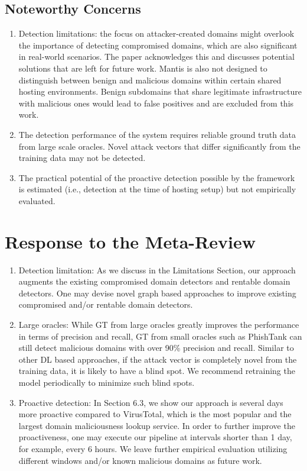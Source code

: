 \subsection{Noteworthy Concerns}
\begin{enumerate}
\item Detection limitations: the focus on attacker-created domains might overlook the importance of detecting compromised domains, which are also significant in real-world scenarios. The paper acknowledges this and discusses potential solutions that are left for future work. Mantis is also not designed to distinguish between benign and malicious domains within certain shared hosting environments. Benign subdomains that share legitimate infrastructure with malicious ones would lead to false positives and are excluded from this work.
\item The detection performance of the system requires reliable ground truth data from large scale oracles. Novel attack vectors that differ significantly from the training data may not be detected. 
\item The practical potential of the proactive detection possible by the framework is estimated (i.e., detection at the time of hosting setup) but not empirically evaluated.
\end{enumerate}

\section{Response to the Meta-Review}

\begin{enumerate}
    \item Detection limitation: As we discuss in the Limitations Section, our approach augments the existing compromised domain detectors and rentable domain detectors. One may devise novel graph based approaches to improve existing compromised and/or rentable domain detectors.
    \item Large oracles: While GT from large oracles greatly improves the performance in terms of precision and recall, GT from small oracles such as PhishTank can still detect malicious domains with over 90\% precision and recall. Similar to other DL based approaches, if the attack vector is completely novel from the training data, it is likely to have a blind spot. We recommend retraining the model periodically to minimize such blind spots.
    \item Proactive detection: In Section 6.3, we show our approach is several days more proactive compared to VirusTotal, which is the most popular and the largest domain maliciousness lookup service. In order to further improve the proactiveness, one may execute our pipeline at intervals shorter than 1 day, for example, every 6 hours. We leave further empirical evaluation utilizing different windows and/or known malicious domains as future work.
\end{enumerate}